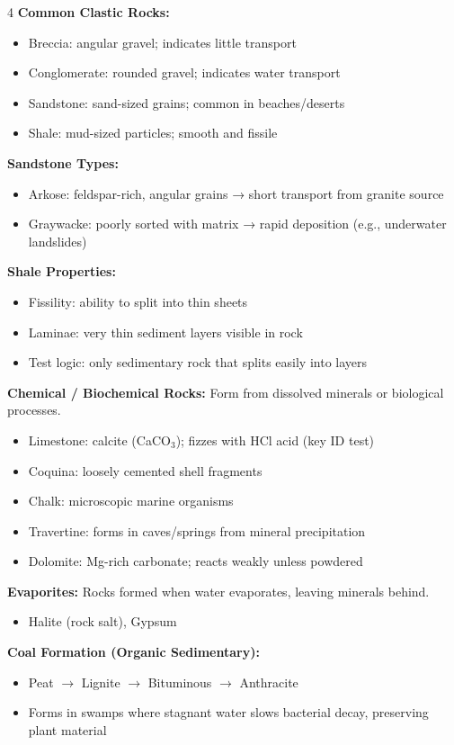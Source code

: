 \documentclass[10pt]{article}
\begin{document}
\begin{multicols}{4}
\textbf{Common Clastic Rocks:}
\begin{itemize}
\item Breccia: angular gravel; indicates little transport
\item Conglomerate: rounded gravel; indicates water transport
\item Sandstone: sand-sized grains; common in beaches/deserts
\item Shale: mud-sized particles; smooth and fissile
\end{itemize}

\textbf{Sandstone Types:}
\begin{itemize}
\item Arkose: feldspar-rich, angular grains → short transport from granite source
\item Graywacke: poorly sorted with matrix → rapid deposition (e.g., underwater landslides)
\end{itemize}

\textbf{Shale Properties:}
\begin{itemize}
\item Fissility: ability to split into thin sheets
\item Laminae: very thin sediment layers visible in rock
\item Test logic: only sedimentary rock that splits easily into layers
\end{itemize}

\textbf{Chemical / Biochemical Rocks:}
Form from dissolved minerals or biological processes.
\begin{itemize}
\item Limestone: calcite (CaCO$_3$); fizzes with HCl acid (key ID test)
\item Coquina: loosely cemented shell fragments
\item Chalk: microscopic marine organisms
\item Travertine: forms in caves/springs from mineral precipitation
\item Dolomite: Mg-rich carbonate; reacts weakly unless powdered
\end{itemize}

\textbf{Evaporites:}
Rocks formed when water evaporates, leaving minerals behind.
\begin{itemize}
\item Halite (rock salt), Gypsum
\end{itemize}

\textbf{Coal Formation (Organic Sedimentary):}
\begin{itemize}
\item Peat $\rightarrow$ Lignite $\rightarrow$ Bituminous $\rightarrow$ Anthracite
\item Forms in swamps where stagnant water slows bacterial decay, preserving plant material
\end{itemize}


\end{multicols}
\end{document}
